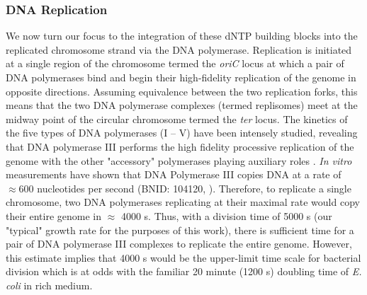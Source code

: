 \subsubsection{DNA Replication}
We now turn our focus to the integration of
these dNTP building blocks into the replicated chromosome strand via the DNA
polymerase. Replication is initiated at a
single region of the chromosome termed the \textit{oriC} locus at which a pair
of DNA polymerases bind and begin their high-fidelity replication of the genome
in opposite directions. Assuming equivalence between the two replication forks,
this means that the two DNA polymerase complexes (termed replisomes) meet at the
midway point of the circular chromosome termed the \textit{ter} locus. The
kinetics of the five types of DNA polymerases (I -- V) have been intensely
studied, revealing that DNA polymerase III performs the high fidelity processive
replication of the genome with the other "accessory" polymerases playing
auxiliary roles \citep{fijalkowska2012}. \textit{In vitro} measurements have
shown that DNA Polymerase III copies DNA at a rate of $\approx 600$ nucleotides
per second (BNID: 104120, \cite{milo2010}). Therefore, to replicate a single
chromosome, two DNA polymerases replicating at their maximal rate would copy their
entire genome in $\approx$ 4000 s. Thus, with a division time of 5000 s (our
"typical" growth rate for the purposes of this work), there is sufficient time
for a pair of DNA polymerase III complexes to replicate the entire genome.
However, this estimate implies that 4000 s would be the upper-limit time scale
for bacterial division which is at odds with the familiar 20 minute (1200 s)
doubling time of \textit{E. coli} in rich medium.

